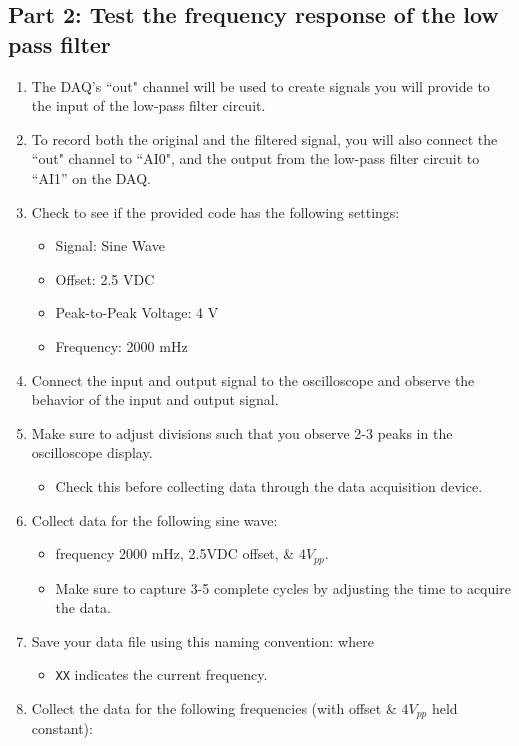 \documentclass{article} %
\begin{document}
\subsection{Part 2: Test the frequency response of the low pass filter}
\begin{enumerate}   
    \item The DAQ's ``out" channel will be used to create signals you will provide to the input of the low-pass filter circuit. 
    \item To record both the original and the filtered signal, you will also connect the ``out" channel to ``AI0", and the output from the low-pass filter circuit to ``AI1'' on the DAQ.
    \item Check to see if the provided code has the following settings:
    \begin{itemize}
      \item Signal: Sine Wave
      \item Offset: 2.5 VDC
      \item Peak-to-Peak Voltage: 4 V
      \item Frequency: 2000 mHz
    \end{itemize}
    \item Connect the input and output signal to the oscilloscope and observe the behavior of the input and output signal. 
    \item Make sure to adjust divisions such that you observe 2-3 peaks in the oscilloscope display. 
    \begin{itemize}
        \item Check this before collecting data through the data acquisition device. 
    \end{itemize}
    \item Collect data for the following sine wave: 
    \begin{itemize}
        \item frequency 2000 mHz, 2.5VDC offset, \& $4V_{pp}$.
        \item Make sure to capture 3-5 complete cycles by adjusting the time to acquire the data.
    \end{itemize}   
    \item Save your data file using this naming convention:  where
    \begin{itemize}
        \item \texttt{XX} indicates the current frequency.
    \end{itemize}
    \item Collect the data for the following frequencies (with offset \& $4V_{pp}$ held constant): 

\end{enumerate}
\end{document}
